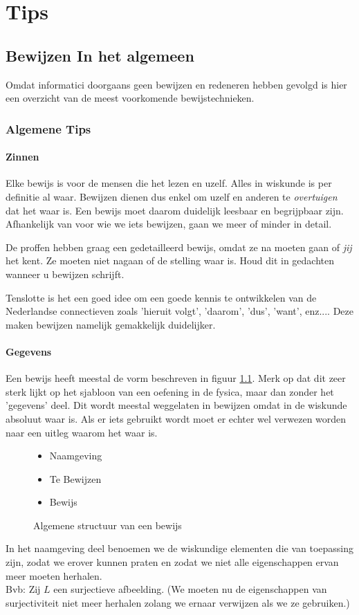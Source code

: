 \documentclass[lineaire_algebra_oplossingen.tex]{subfiles}
\begin{document}
\chapter{Tips}
\section{Bewijzen In het algemeen}
Omdat informatici doorgaans geen bewijzen en redeneren hebben gevolgd is hier een overzicht van de meest voorkomende bewijstechnieken.

\subsection{Algemene Tips}
\subsubsection{Zinnen}
Elke bewijs is voor de mensen die het lezen en uzelf. Alles in wiskunde is per definitie al waar. Bewijzen dienen dus enkel om uzelf en anderen te \emph{overtuigen} dat het waar is. Een bewijs moet daarom duidelijk leesbaar en begrijpbaar zijn. Afhankelijk van voor wie we iets bewijzen, gaan we meer of minder in detail. 

De proffen hebben graag een gedetailleerd bewijs, omdat ze na moeten gaan of \emph{jij} het kent. Ze moeten niet nagaan of de stelling waar is. Houd dit in gedachten wanneer u bewijzen schrijft.

Tenslotte is het een goed idee om een goede kennis te ontwikkelen van de Nederlandse connectieven zoals 'hieruit volgt', 'daarom', 'dus', 'want', enz.... Deze maken bewijzen namelijk gemakkelijk duidelijker.
\subsubsection{Gegevens}
Een bewijs heeft meestal de vorm beschreven in figuur \ref{algemeen_bewijs}. Merk op dat dit zeer sterk lijkt op het sjabloon van een oefening in de fysica, maar dan zonder het 'gegevens' deel. Dit wordt meestal weggelaten in bewijzen omdat in de wiskunde absoluut waar is. Als er iets gebruikt wordt moet er echter wel verwezen worden naar een uitleg waarom het waar is.
\begin{figure}[H]
\begin{itemize}
\item Naamgeving
\item Te Bewijzen
\item Bewijs
\end{itemize}
\caption{Algemene structuur van een bewijs}
\label{algemeen_bewijs}
\end{figure}
In het naamgeving deel benoemen we de wiskundige elementen die van toepassing zijn, zodat we erover kunnen praten en zodat we niet alle eigenschappen ervan meer moeten herhalen.\\
Bvb: Zij $L$ een surjectieve afbeelding. (We moeten nu de eigenschappen van surjectiviteit niet meer herhalen zolang we ernaar verwijzen als we ze gebruiken.)
\end{document}
